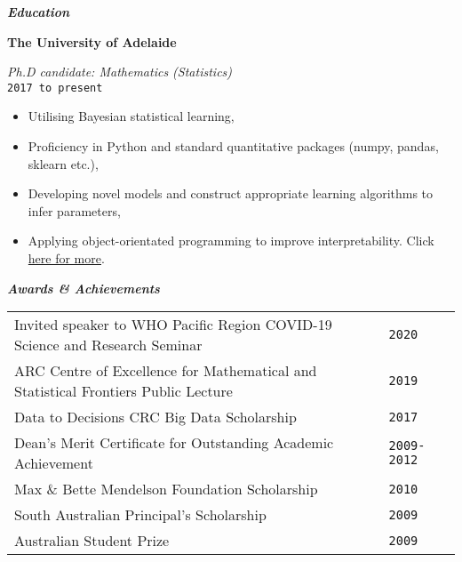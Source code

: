 \documentclass{article}
\begin{document}
\begin{multicols}{2}

\textbf{\emph{Education}}

\textbf{ The University of Adelaide} 

\emph{Ph.D candidate: Mathematics (Statistics)}\\
 \texttt{2017 to present}
\hypersetup{urlcolor=black}
\begin{itemize}
	\item Utilising Bayesian statistical learning,
	\item Proficiency in Python and standard quantitative packages (numpy, pandas, sklearn etc.),
	\item Developing novel models and construct appropriate learning algorithms to infer parameters,
	\item Applying object-orientated programming to improve interpretability. Click \href{https://tdennisliu.github.io/tutorials/1-simple-search-and-recursion.html#Towers-of-Hanoi}{here for more}.
\end{itemize}





\textbf{\emph{Awards \& Achievements}}

\centering
\begin{tabular}{ p{6.75cm} p{0.25cm} }
Invited speaker to WHO Pacific Region COVID-19 Science and Research Seminar & \texttt{2020} \\
ARC Centre of Excellence for Mathematical and Statistical Frontiers Public Lecture & \texttt{2019}\\
Data to Decisions CRC {Big Data Scholarship} &  \texttt{2017} \\
Dean's Merit Certificate for Outstanding Academic Achievement & \texttt{2009- 2012} \\

Max \& Bette Mendelson Foundation Scholarship & \texttt{2010}\\
South Australian Principal's Scholarship & \texttt{2009} \\
Australian Student Prize & \texttt{2009} \\
\end{tabular}
\end{multicols}
\end{document}
